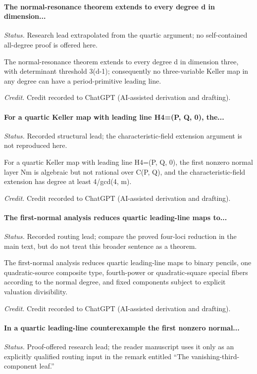 \label{supp-note-02-013}
\paragraph{The normal-resonance theorem extends to every degree d in dimension...}
\emph{Status.} Research lead extrapolated from the quartic argument; no
self-contained all-degree proof is offered here.

The normal-resonance theorem extends to every degree d in dimension three, with determinant threshold 3(d-1); consequently no three-variable Keller map in any degree can have a period-primitive leading line.

\emph{Credit.} Credit recorded to ChatGPT (AI-assisted derivation and drafting).

\label{supp-note-02-014}
\paragraph{For a quartic Keller map with leading line H4=(P, Q, 0), the...}
\emph{Status.} Recorded structural lead; the characteristic-field extension
argument is not reproduced here.

For a quartic Keller map with leading line H4=(P, Q, 0), the first nonzero normal layer Nm is algebraic but not rational over C(P, Q), and the characteristic-field extension has degree at least 4/gcd(4, m).

\emph{Credit.} Credit recorded to ChatGPT (AI-assisted derivation and drafting).

\label{supp-note-02-015}
\paragraph{The first-normal analysis reduces quartic leading-line maps to...}
\emph{Status.} Recorded routing lead; compare the proved four-loci reduction
in the main text, but do not treat this broader sentence as a theorem.

The first-normal analysis reduces quartic leading-line maps to binary pencils, one quadratic-source composite type, fourth-power or quadratic-square special fibers according to the normal degree, and fixed components subject to explicit valuation divisibility.

\emph{Credit.} Credit recorded to ChatGPT (AI-assisted derivation and drafting).

\label{supp-note-02-016}
\paragraph{In a quartic leading-line counterexample the first nonzero normal...}
\emph{Status.} Proof-offered research lead; the reader manuscript uses it
only as an explicitly qualified routing input in the remark entitled
``The vanishing-third-component leaf.''

